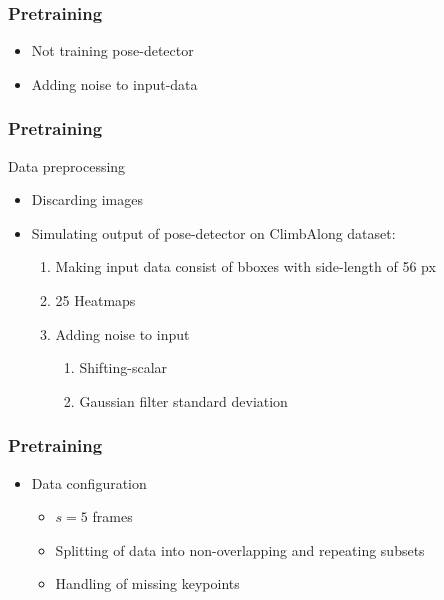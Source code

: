 \documentclass{beamer}
\begin{document}
\begin{frame}
    \frametitle{Pretraining}
    \begin{itemize}
        \item<1-> Not training pose-detector 
        \item<2-> Adding noise to input-data
    \end{itemize}
\end{frame}

\begin{frame}
    \frametitle{Pretraining}
    Data preprocessing
    \begin{itemize}
        \item<1-> Discarding images
        \item<2-> Simulating output of pose-detector on ClimbAlong dataset:
        \begin{enumerate}
            \item<2-> Making input data consist of bboxes with side-length of 56 px
            \item<3-> 25 Heatmaps
            \item<4-> Adding noise to input
            \begin{enumerate}
                \item Shifting-scalar
                \item Gaussian filter standard deviation
            \end{enumerate}
        \end{enumerate}
    \end{itemize}
\end{frame}

\begin{frame}
    \frametitle{Pretraining}
    \begin{itemize}
        \item<1-> Data configuration
        \begin{itemize}
            \item $s = 5$ frames
            \item Splitting of data into non-overlapping and repeating subsets
            \item Handling of missing keypoints
        \end{itemize}
    \end{itemize}
\end{frame}
\end{document}
